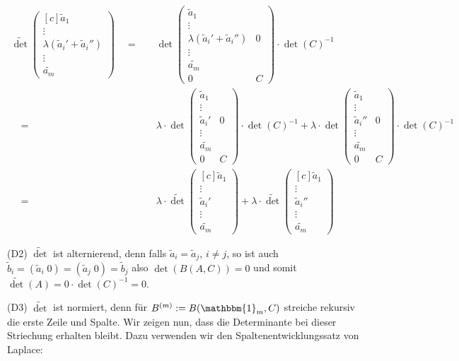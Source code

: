 \documentclass{article}
\newcommand{\eq}{\mathbb{\quad = \quad}}
\newcommand{\vect}[1]{\begin{pmatrix*}[c] #1 \end{pmatrix*}}
\newcommand{\legs}[2]{\left(\begin{array}{#1}#2\end{array}\right)}
\begin{document}
\begin{align*}
    \widetilde{\det}\vect{\tilde{a}_1 \\ \vdots \\  \lambda(\tilde{a}_i'+\tilde{a}_i'') \\ \vdots \\ \tilde{a_m}}
    \eq 
    &\det\legs{cc}{\tilde{a}_1\\ \vdots \\  \lambda(\tilde{a}_i'+\tilde{a}_i'') & 0 \\ \vdots \\ \tilde{a_m} \\ 0 & C} \cdot \det(C)^{-1} \\
    \eq 
    &\lambda \cdot
    \det\legs{cc}{\tilde{a}_1\\ \vdots \\  \tilde{a}_i' & 0 \\ \vdots \\ \tilde{a_m} \\ 0 & C} 
    \cdot \det(C)^{-1}
    +
    \lambda \cdot
    \det\legs{cc}{\tilde{a}_1\\ \vdots \\  \tilde{a}_i'' & 0 \\ \vdots \\ \tilde{a_m} \\ 0 & C}
    \cdot \det(C)^{-1}\\
    \eq 
    &\lambda \cdot
    \widetilde{\det}\vect{\tilde{a}_1 \\ \vdots \\  \tilde{a}_i' \\ \vdots \\ \tilde{a_m}}+
    \lambda \cdot
    \widetilde{\det}\vect{\tilde{a}_1 \\ \vdots \\  \tilde{a}_i'' \\ \vdots \\ \tilde{a_m}}
\end{align*}

(D2) $\widetilde{\det}$ ist alternierend, denn falls
$\tilde{a}_i = \tilde{a}_j$,
$i \neq j$,
so ist auch
$\tilde{b}_i = (\tilde{a}_i \; 0) = (\tilde{a}_j \; 0) =\tilde{b}_j$
also
$\det(B(A,C)) = 0$
und somit
$\widetilde{\det}(A) = 0 \cdot \det(C)^{-1} = 0$.

\bigbreak
(D3) $\widetilde{\det}$ ist normiert, denn für
$B^{(m)} := B(\mathbbm{1}_m, C)$
streiche rekursiv die erste Zeile und Spalte.
Wir zeigen nun,
dass die Determinante bei dieser Striechung
erhalten bleibt. Dazu verwenden wir den
Spaltenentwicklungssatz von Laplace:
\end{document}
